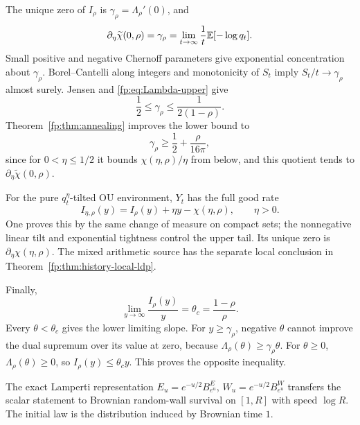 The unique zero of $I_\rho$ is $\gamma_\rho=\Lambda_\rho'(0)$, and
\begin{equation}\label{fp:eq:quenched-derivative}
 \partial_\eta\widetilde\chi(0,\rho)=\gamma_\rho
 =\lim_{t\to\infty}\frac1t\mathbb E[-\log q_t].
\end{equation}
Small positive and negative Chernoff parameters give exponential concentration about $\gamma_\rho$. Borel--Cantelli along integers and monotonicity of $S_t$ imply $S_t/t\to\gamma_\rho$ almost surely. Jensen and \eqref{fp:eq:Lambda-upper} give
\[
 \frac12\le\gamma_\rho\le\frac1{2(1-\rho)}.
\]
Theorem~\ref{fp:thm:annealing} improves the lower bound to
\begin{equation}\label{fp:eq:gamma-strict}
 \gamma_\rho\ge\frac12+\frac\rho{16\pi},
\end{equation}
since for $0<\eta\le1/2$ it bounds $\chi(\eta,\rho)/\eta$ from below, and this quotient tends to $\partial_\eta\widetilde\chi(0,\rho)$.

For the pure $q_t^\eta$-tilted OU environment, $Y_t$ has the full good rate
\begin{equation}\label{fp:eq:tilted-rate}
 I_{\eta,\rho}(y)=I_\rho(y)+\eta y-\chi(\eta,\rho),\qquad\eta>0.
\end{equation}
One proves this by the same change of measure on compact sets; the nonnegative linear tilt and exponential tightness control the upper tail. Its unique zero is $\partial_\eta\chi(\eta,\rho)$. The mixed arithmetic source has the separate local conclusion in
Theorem~\ref{fp:thm:history-local-ldp}.

Finally,
\begin{equation}\label{fp:eq:tail-slope}
 \lim_{y\to\infty}\frac{I_\rho(y)}y
 =\theta_c=\frac{1-\rho}{\rho}.
\end{equation}
Every $\theta<\theta_c$ gives the lower limiting slope. For $y\ge\gamma_\rho$, negative $\theta$ cannot improve the dual supremum over its value at zero, because $\Lambda_\rho(\theta)\ge\gamma_\rho\theta$. For $\theta\ge0$, $\Lambda_\rho(\theta)\ge0$, so $I_\rho(y)\le\theta_cy$. This proves the opposite inequality.

The exact Lamperti representation $E_u=e^{-u/2}B^E_{e^u}$, $W_u=e^{-u/2}B^W_{e^u}$ transfers the scalar statement to Brownian random-wall survival on $[1,R]$ with speed $\log R$. The initial law is the distribution induced by Brownian time $1$.
